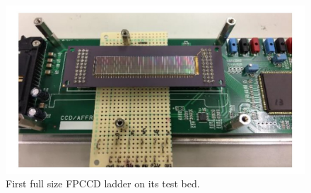 \begin{figure}[t!]
\centering
\includegraphics[width=0.7\hsize]{Detector/fig/VTX_FPCCD.jpg}
\caption{First full size FPCCD ladder on its test bed.}
\label{fig:det:VTX_FPCCD}
\end{figure}

